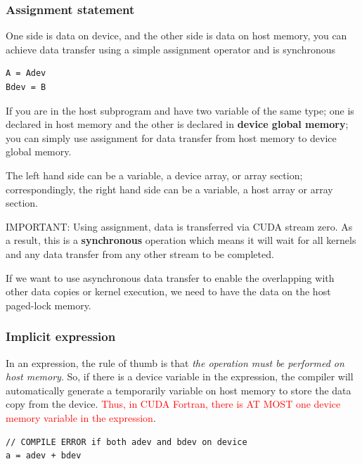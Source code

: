 \subsubsection{Assignment statement}
\label{sec:assignment-statement}

One side is data on device, and the other side is data on host memory,
you can achieve data transfer using a simple assignment operator and
is synchronous
\begin{lstlisting}
A = Adev
Bdev = B
\end{lstlisting}
If you are in the host subprogram and have two variable of the same
type; one is declared in host memory and the other is declared
in {\bf device global memory}; you can simply use assignment for data
transfer from host memory to device global memory.

The left hand side can be a variable, a device array, or array
section; correspondingly, the right hand side can be a variable, a
host array or array section. 


\begin{framed}
  IMPORTANT: Using assignment, data is transferred via CUDA stream
  zero. As a result, this is a {\bf synchronous} operation which means
  it will wait for all kernels and any data transfer from any other
  stream to be completed.

  If we want to use asynchronous data transfer to enable the
  overlapping with other data copies or kernel execution, we need to
  have the data on the host paged-lock memory.
\end{framed}

\subsubsection{Implicit expression}
\label{sec:implicit-expression}

In an expression, the rule of thumb is that
{\it the operation must be performed on host memory}. So, if there is
a device variable in the expression, the compiler will automatically
generate a temporarily variable on host memory to store the data copy
from the device.
\textcolor{red}{Thus, in CUDA Fortran, there is AT MOST one device
  memory variable in the expression}.
\begin{lstlisting}
// COMPILE ERROR if both adev and bdev on device
a = adev + bdev
\end{lstlisting}

